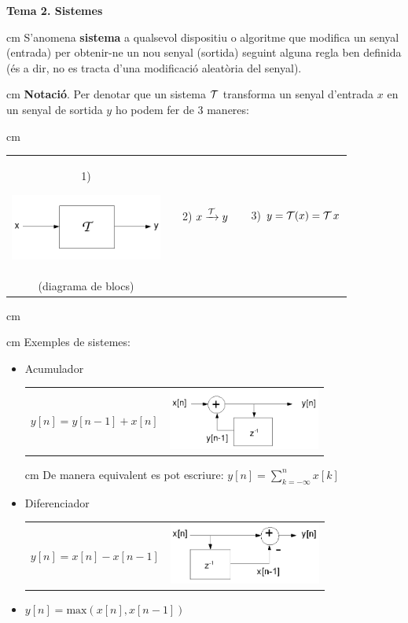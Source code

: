 \documentclass{article}
\begin{document}
\textbf{\Large Tema 2. Sistemes}

 cm
\noindent
S'anomena \textbf{sistema} a qualsevol dispositiu o algoritme que modifica un senyal (entrada) 
per obtenir-ne un nou senyal (sortida) seguint alguna regla ben definida
(\'es a dir, no es tracta d'una modificaci\'o aleat\`oria del senyal).

 cm
\noindent
\textbf{Notaci\'o}. Per denotar que un sistema ${\cal T}$ transforma un senyal d'entrada $x$ 
en un senyal de sortida $y$ ho podem fer de 3 maneres:

 cm
\begin{center}
\begin{tabular}{ccccc}
1) 
\begin{minipage}{5cm}\includegraphics[width=5cm]{notaciosistema.png}\end{minipage} & &
2) $x \xrightarrow{{\cal T}} y $ & & 3) $y={\cal T}(x)={\cal T} \, x$ \\
(diagrama de blocs) & & & & 
\end{tabular}
\end{center}
 cm


 cm
\noindent
Exemples de sistemes:
\begin{itemize}
\item Acumulador

\begin{tabular}{lr}
$y[n]=y[n-1]+x[n]$ &
\begin{minipage}{5cm}\includegraphics[width=5cm]{acumulador.png}\end{minipage}
\end{tabular}

 cm
\noindent
De manera equivalent es pot escriure: $y[n]=\sum_{k=-\infty}^n x[k]$

\item Diferenciador

\begin{tabular}{lr}
$y[n]=x[n]-x[n-1]$ &
\begin{minipage}{5cm}\includegraphics[width=5cm]{diferenciador.png}\end{minipage}
\end{tabular}

\item $y[n]=\mathrm{max}(x[n], x[n-1])$

\end{itemize}
\end{document}
